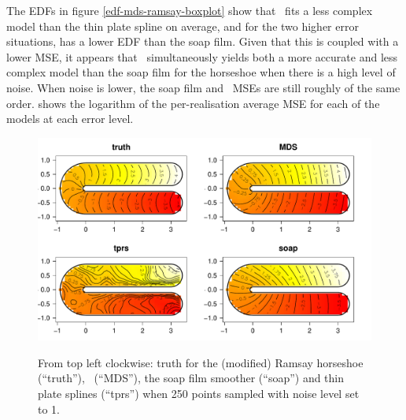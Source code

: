 The EDFs in figure \ref{edf-mds-ramsay-boxplot} show that \mdsap\ fits a less complex model than the thin plate spline on average, and for the two higher error situations, has a lower EDF than the soap film. Given that this is coupled with a lower MSE, it appears that \mdsap\ simultaneously yields both a more accurate and less complex model than the soap film for the horseshoe when there is a high level of noise. When noise is lower, the soap film and \mdsap\ MSEs are still roughly of the same order.  shows the logarithm of the per-realisation average MSE for each of the models at each error level.

\begin{figure}
\centering
\includegraphics[width=6in]{mds/figs/ramsay-fit-1.pdf} \\
\caption{From top left clockwise: truth for the (modified) Ramsay horseshoe (``truth''), \mdsap\ (``MDS''), the soap film smoother (``soap'') and thin plate splines (``tprs'') when 250 points sampled with noise level set to 1.}
\label{mds-ramsay-fit-1}
\end{figure}

